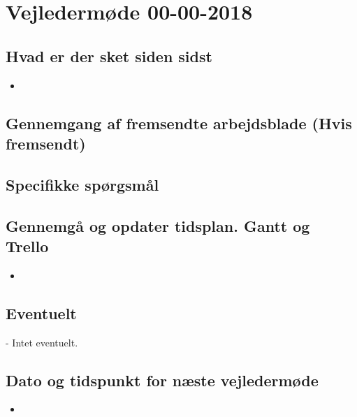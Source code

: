 \newpage
\section{Vejledermøde 00-00-2018}
\subsection{Hvad er der sket siden sidst}
\begin{itemize}
    \item 
\end{itemize}
    
\subsection{Gennemgang af fremsendte arbejdsblade (Hvis fremsendt)}

\subsection{Specifikke spørgsmål}

\subsection{Gennemgå og opdater tidsplan. Gantt og Trello}
\begin{itemize}
    \item 
\end{itemize}
    
\subsection{Eventuelt}
- Intet eventuelt.

\subsection{Dato og tidspunkt for næste vejledermøde}
\begin{itemize}
    \item
\end{itemize}